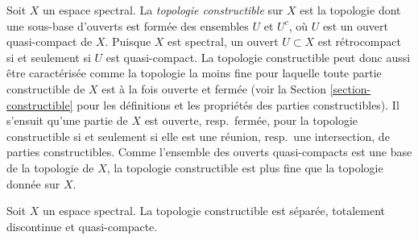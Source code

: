 \medskip\noindent
Soit $X$ un espace spectral. La {\it topologie constructible} sur $X$
est la topologie dont une sous-base d'ouverts est formée des ensembles $U$
et $U^c$, où $U$ est un ouvert quasi-compact de $X$. Puisque $X$ est spectral,
un ouvert $U \subset X$ est rétrocompact si et seulement si $U$ est
quasi-compact. La topologie constructible peut donc aussi être caractérisée
comme la topologie la moins fine pour laquelle toute partie constructible de
$X$ est à la fois ouverte et fermée (voir la Section
\ref{section-constructible} pour les définitions et les propriétés des parties
constructibles).
Il s'ensuit qu'une partie de $X$ est ouverte, resp.\ fermée, pour la topologie
constructible si et seulement si elle est une réunion, resp.\ une intersection,
de parties constructibles. Comme l'ensemble des ouverts quasi-compacts est une
base de la topologie de $X$, la topologie constructible est plus fine que la
topologie donnée sur $X$.

\begin{lemma}
\label{lemma-constructible-hausdorff-quasi-compact}
Soit $X$ un espace spectral. La topologie constructible est séparée,
totalement discontinue et quasi-compacte.
\end{lemma}

